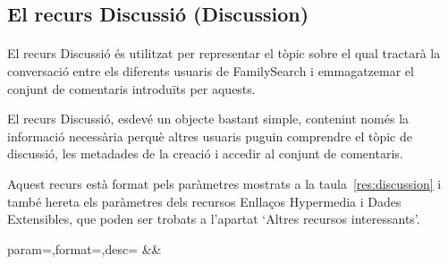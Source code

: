 \subsection{El recurs Discussió (Discussion)}

    \paragraph{}
    El recurs Discussió és utilitzat per representar el tòpic sobre el qual tractarà la conversació entre els diferents usuaris de FamilySearch i emmagatzemar el conjunt de comentaris introduïts per aquests.

    El recurs Discussió, esdevé un objecte bastant simple, contenint només la informació necessària perquè altres usuaris puguin comprendre el tòpic de discussió, les metadades de la creació i accedir al conjunt de comentaris.

    Aquest recurs està format pels paràmetres mostrats a la taula~\ref{res:discussion} i també hereta els paràmetres dels recursos Enllaços Hypermedia i Dades Extensibles, que poden ser trobats a l'apartat `Altres recursos interessants'.

    \begin{center}
             {param=\param,format=\format,desc=\desc}
             {\param&\format&\desc}
     \end{center}
